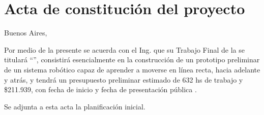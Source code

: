 \documentclass[11pt]{charter}
\begin{document}
\pagebreak



\section{Acta de constitución del proyecto}
\label{sec:acta}

\begin{flushright}
Buenos Aires, \fechaInicioName
\end{flushright}

\vspace{2cm}

Por medio de la presente se acuerda con el Ing. \authorname\hspace{1px} que su Trabajo Final de la \degreename\hspace{1px} se titulará ``\ttitle'', consistirá esencialmente en la construcción de un prototipo preliminar de un sistema robótico capaz de aprender a moverse en línea recta, hacia adelante y atrás, y tendrá un presupuesto preliminar estimado de 632 hs de trabajo y \$211.939, con fecha de inicio \fechaInicioName\hspace{1px} y fecha de presentación pública \fechaFinalName.

Se adjunta a esta acta la planificación inicial.

\vfill
\end{document}
